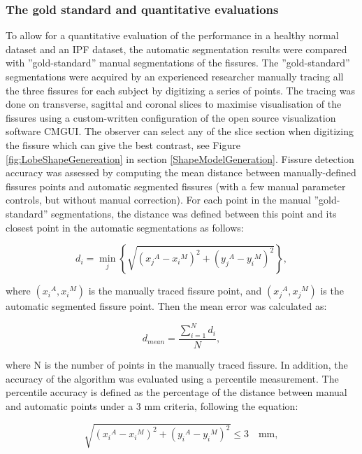 {\subsubsection{The gold standard and quantitative evaluations}
To allow for a quantitative evaluation of the performance in a healthy normal dataset and an IPF dataset, the automatic segmentation results were compared with ''gold-standard'' manual segmentations of the fissures. The ''gold-standard'' segmentations were acquired by an experienced researcher manually tracing all the three fissures for each subject by digitizing a series of points. The tracing was done on transverse, sagittal and coronal slices to maximise visualisation of the fissures using a custom-written configuration of the open source visualization software CMGUI. The observer can select any of the slice section when digitizing the fissure which can give the best contrast, see Figure \ref{fig:LobeShapeGenereation} in section \ref{ShapeModelGeneration}. Fissure detection accuracy was assessed by computing the mean distance between manually-defined fissures points and automatic segmented fissures (with a few manual parameter controls, but without manual correction). For each point in the manual ''gold-standard'' segmentations, the distance was defined between this point and its closest point in the automatic segmentations as follows:

\begin{equation}
\label{eq:Distance1}
d_i =  \operatorname*{min}\limits_{j}\left\{\sqrt{{({x_j}^A-{x_i}^M)}^2 + {({y_j}^A-{y_i}^M)}^2}\right\},
\end{equation}

\noindent where $({x_i}^A, {x_i}^M)$ is the manually traced fissure point, and $({x_j}^A, {x_j}^M)$ is the automatic segmented fissure point. Then the mean error was calculated as:

\begin{equation}
\label{eq:MeanDistance}
d_{mean} = \frac{\sum\nolimits_{i=1}^N d_i}{N},
\end{equation}

\noindent where N is the number of points in the manually traced fissure. In addition, the accuracy of the algorithm was evaluated using a percentile measurement. The percentile accuracy is defined as the percentage of the distance between manual and automatic points under a 3 mm criteria, following the equation:

\begin{equation}
\label{eq:PercentileMeasurement}
\sqrt{({{x_i}^A-{x_i}^M})^2 + ({{y_i}^A-{y_i}^M})^2} \leq 3 \quad \text{mm},
\end{equation}

}
